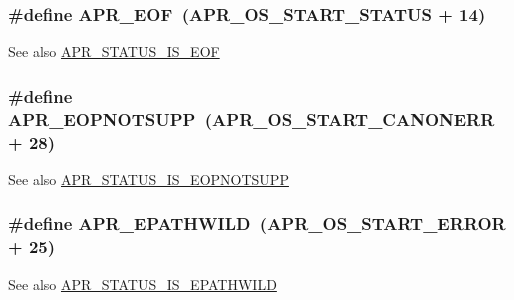 \subsubsection[{\texorpdfstring{A\+P\+R\+\_\+\+E\+OF}{APR_EOF}}]{\setlength{\rightskip}{0pt plus 5cm}\#define A\+P\+R\+\_\+\+E\+OF~({\bf A\+P\+R\+\_\+\+O\+S\+\_\+\+S\+T\+A\+R\+T\+\_\+\+S\+T\+A\+T\+US} + 14)}\hypertarget{group__APR__Error_ga35d9dca2514c522a2840aca0f3e2ebd3}{}\label{group__APR__Error_ga35d9dca2514c522a2840aca0f3e2ebd3}
\begin{DoxySeeAlso}{See also}
\hyperlink{group__APR__STATUS__IS_gaf4232cd96b47b76aec9607b1a78e694f}{A\+P\+R\+\_\+\+S\+T\+A\+T\+U\+S\+\_\+\+I\+S\+\_\+\+E\+OF} 
\end{DoxySeeAlso}
\subsubsection[{\texorpdfstring{A\+P\+R\+\_\+\+E\+O\+P\+N\+O\+T\+S\+U\+PP}{APR_EOPNOTSUPP}}]{\setlength{\rightskip}{0pt plus 5cm}\#define A\+P\+R\+\_\+\+E\+O\+P\+N\+O\+T\+S\+U\+PP~({\bf A\+P\+R\+\_\+\+O\+S\+\_\+\+S\+T\+A\+R\+T\+\_\+\+C\+A\+N\+O\+N\+E\+RR} + 28)}\hypertarget{group__APR__Error_ga6f02032ddad10077dbc9872ec4a6030e}{}\label{group__APR__Error_ga6f02032ddad10077dbc9872ec4a6030e}
\begin{DoxySeeAlso}{See also}
\hyperlink{group__APR__STATUS__IS_ga6180aadcf4411304443a974dfff172af}{A\+P\+R\+\_\+\+S\+T\+A\+T\+U\+S\+\_\+\+I\+S\+\_\+\+E\+O\+P\+N\+O\+T\+S\+U\+PP} 
\end{DoxySeeAlso}
\subsubsection[{\texorpdfstring{A\+P\+R\+\_\+\+E\+P\+A\+T\+H\+W\+I\+LD}{APR_EPATHWILD}}]{\setlength{\rightskip}{0pt plus 5cm}\#define A\+P\+R\+\_\+\+E\+P\+A\+T\+H\+W\+I\+LD~({\bf A\+P\+R\+\_\+\+O\+S\+\_\+\+S\+T\+A\+R\+T\+\_\+\+E\+R\+R\+OR} + 25)}\hypertarget{group__APR__Error_ga01d0fb965051103b5c8f15a43ad2c767}{}\label{group__APR__Error_ga01d0fb965051103b5c8f15a43ad2c767}
\begin{DoxySeeAlso}{See also}
\hyperlink{group__APR__STATUS__IS_gae23aedf7ad4e6a111ffd6acf4167b00e}{A\+P\+R\+\_\+\+S\+T\+A\+T\+U\+S\+\_\+\+I\+S\+\_\+\+E\+P\+A\+T\+H\+W\+I\+LD} 
\end{DoxySeeAlso}
